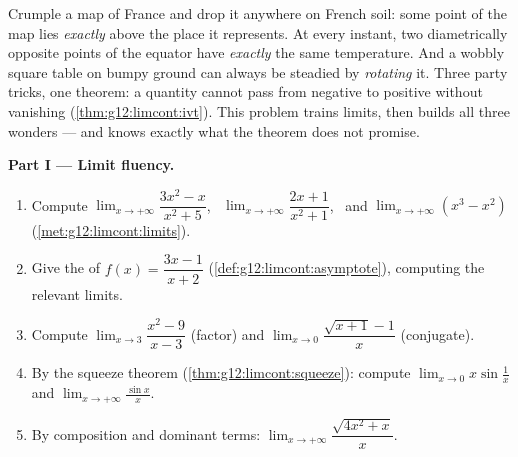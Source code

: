 \begin{problem}
\label{pb:g12:limcont:1}
Crumple a map of France and drop it anywhere on French soil: some
point of the map lies \emph{exactly} above the place it
represents. At every instant, two diametrically opposite points
of the equator have \emph{exactly} the same temperature. And a
wobbly square table on bumpy ground can always be steadied by
\emph{rotating} it. Three party tricks, one theorem: a 
quantity cannot pass from negative to positive without vanishing
(\cref{thm:g12:limcont:ivt}). This problem trains limits, then
builds all three wonders --- and knows exactly what the theorem
does not promise.

\medskip
\noindent\textbf{Part I --- Limit fluency.}
\begin{enumerate}
  \item Compute $\lim_{x \to +\infty} \dfrac{3x^2 - x}{x^2 + 5}$,
        \ $\lim_{x \to +\infty} \dfrac{2x + 1}{x^2 + 1}$, \ and
        $\lim_{x \to +\infty} (x^3 - x^2)$
        (\cref{met:g12:limcont:limits}).
  \item Give the  of
        $f(x) = \dfrac{3x - 1}{x + 2}$
        (\cref{def:g12:limcont:asymptote}), computing the
        relevant limits.
  \item Compute $\lim_{x \to 3} \dfrac{x^2 - 9}{x - 3}$
        (factor) and
        $\lim_{x \to 0} \dfrac{\sqrt{x + 1} - 1}{x}$
        (conjugate).
  \item By the squeeze theorem
        (\cref{thm:g12:limcont:squeeze}): compute
        $\lim_{x \to 0} x \sin\frac1x$ and
        $\lim_{x \to +\infty} \frac{\sin x}{x}$.
  \item By composition and dominant terms:
        $\lim_{x \to +\infty} \dfrac{\sqrt{4x^2 + x}}{x}$.
\end{enumerate}


\end{problem}
